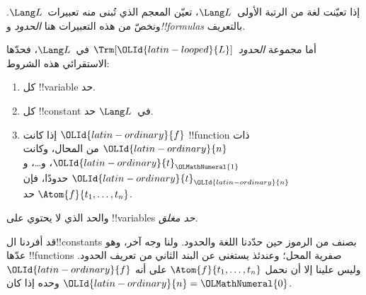 \documentclass[../../../include/open-logic-section]{subfiles}
\begin{document}


إذا تعيّنت لغة من الرتبة الأولى~$\Lang L$، تعيّن المعجم الذي تُبنى
منه تعبيرات~$\Lang L$. ونخصّ من هذه التعبيرات هنا
\emph{الحدود} و\emph{!!{formula}s} بالتعريف.

\begin{defn}[الحدود]
أما مجموعة \emph{الحدود}~$\Trm[{\OLId{latin-looped}{L}}]$ في~$\Lang L$، فحدّها الاستقرائي
هذه الشروط:
\begin{enumerate}
\item كل !!{variable} حد.
\item كل !!{constant} في~$\Lang L$ حد.
\item إذا كانت ${\OLId{latin-ordinary}{f}}$ !!{function} ذات ${\OLId{latin-ordinary}{n}}$ من المحال، وكانت
  ${\OLId{latin-ordinary}{t}}_{\OLMathNumeral{1}}$، و\dots، و${\OLId{latin-ordinary}{t}}_{\OLId{latin-ordinary}{n}}$ حدودًا، فإن
  $\Atom{f}{t_1, \ldots, t_n}$ حد.
\end{enumerate}
والحد الذي لا يحتوي على !!{variable}s \emph{حد مغلق}.
\end{defn}

\begin{explain}
قد أفردنا ال!!{constant}s بصنف من الرموز حين حدّدنا اللغة والحدود.
ولنا وجه آخر، وهو عدّها !!{function}s صفرية المحل؛ وعندئذ يستغنى
عن البند الثاني من تعريف الحدود. وليس علينا إلا أن نحمل $\Atom{f}{t_1, \ldots, t_n}$ على أنه ${\OLId{latin-ordinary}{f}}$ وحده إذا
كان ${\OLId{latin-ordinary}{n}} = {\OLMathNumeral{0}}$.
\end{explain}
\end{document}
